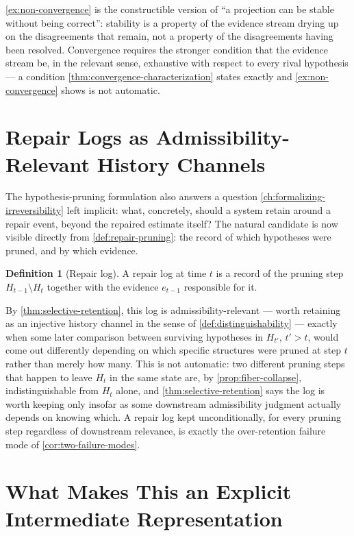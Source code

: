 \documentclass[11pt]{book}
\theoremstyle{plain}
\theoremstyle{definition}
\newtheorem{definition}[theorem]{Definition}
\theoremstyle{remark}
\begin{document}
\cref{ex:non-convergence} is the constructible version of \enquote{a
projection can be stable without being correct}: stability is a
property of the evidence stream drying up on the disagreements that
remain, not a property of the disagreements having been resolved.
Convergence requires the stronger condition that the evidence stream
be, in the relevant sense, exhaustive with respect to every rival
hypothesis --- a condition \cref{thm:convergence-characterization}
states exactly and \cref{ex:non-convergence} shows is not automatic.

\section{Repair Logs as Admissibility-Relevant History Channels}

The hypothesis-pruning formulation also answers a question
\cref{ch:formalizing-irreversibility} left implicit: what, concretely,
should a system retain around a repair event, beyond the repaired
estimate itself? The natural candidate is now visible directly from
\cref{def:repair-pruning}: the record of which hypotheses were pruned,
and by which evidence.

\begin{definition}[Repair log]
\label{def:repair-log}
A repair log at time $t$ is a record of the pruning step $H_{t-1}
\setminus H_t$ together with the evidence $e_{t-1}$ responsible for it.
\end{definition}

By \cref{thm:selective-retention}, this log is admissibility-relevant
--- worth retaining as an injective history channel in the sense of
\cref{def:distinguishability} --- exactly when some later comparison
between surviving hypotheses in $H_{t'}$, $t' > t$, would come out
differently depending on which specific structures were pruned at
step $t$ rather than merely how many. This is not automatic: two
different pruning steps that happen to leave $H_t$ in the same state
are, by \cref{prop:fiber-collapse}, indistinguishable from $H_t$
alone, and \cref{thm:selective-retention} says the log is worth
keeping only insofar as some downstream admissibility judgment
actually depends on knowing which. A repair log kept unconditionally,
for every pruning step regardless of downstream relevance, is exactly
the over-retention failure mode of \cref{cor:two-failure-modes}.

\section{What Makes This an Explicit Intermediate Representation}
\label{sec:explicit-intermediate}
\end{document}
